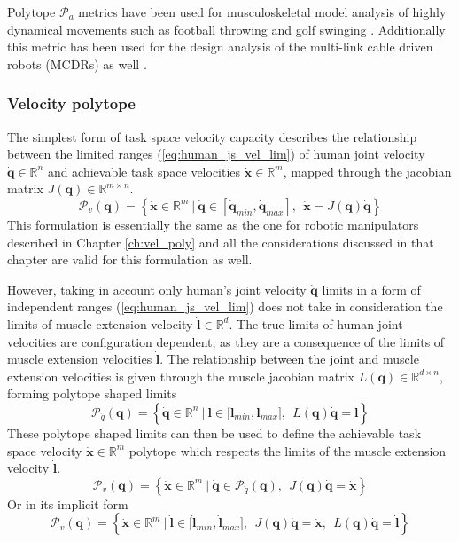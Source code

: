 Polytope $\mathcal{P}_a$ metrics have been used for musculoskeletal model analysis of highly dynamical movements such as football throwing \cite{khatib2009robotics} and golf swinging \cite{demircan2012muscle}. Additionally this metric has been used for the design analysis of the multi-link cable driven robots (MCDRs) as well \cite{sheng2020operational}.

\subsubsection{Velocity polytope}

The simplest form of task space velocity capacity describes the relationship between the limited ranges (\ref{eq:human_js_vel_lim}) of human joint velocity $\dot{\bm{q}} \in \mathbb{R}^n$ and achievable task space velocities $\dot{\bm{x}} \in \mathbb{R}^m$, mapped through the jacobian matrix $J(\bm{q}) \in \mathbb{R}^{m\times n}$.
\begin{equation}
    \mathcal{P}_v(\bm{q}) = \left\{ \dot{\bm{x}} \in \mathbb{R}^m ~|~ \dot{\bm{q}}\in\left[\dot{\bm{q}}_{min}, \dot{\bm{q}}_{max} \right], ~~ \dot{\bm{x}} = J(\bm{q})\dot{\bm{q}} \right\}
\end{equation}
This formulation is essentially the same as the one for robotic manipulators described in Chapter \ref{ch:vel_poly} and all the considerations discussed in that chapter are valid for this formulation as well.

However, taking in account only human's joint velocity $\dot{\bm{q}}$ limits in a form of independent ranges (\ref{eq:human_js_vel_lim}) does not take in consideration the limits of muscle extension velocity $\dot{\bm{l}}\in\mathbb{R}^d$. The true limits of human joint velocities are configuration dependent, as they are a consequence of the limits of muscle extension velocities $\dot{\bm{l}}$. The relationship between the joint and muscle extension velocities is given through the muscle jacobian matrix $L(\bm{q}) \in \mathbb{R}^{d\times n}$, forming polytope shaped limits
\begin{equation}
    \mathcal{P}_{\dot{q}}(\bm{q}) = \left\{ \dot{\bm{q}} \in \mathbb{R}^n ~|~ \dot{\bm{l}}\in\big[\dot{\bm{l}}_{min}, \dot{\bm{l}}_{max} \big], ~~ L(\bm{q})\dot{\bm{q}} = \dot{\bm{l}} \right\}
    \label{eq:human_poly_joint_vel}
\end{equation}
These polytope shaped limits can then be used to define the achievable task space velocity $\dot{\bm{x}}\in \mathbb{R}^m$ polytope which respects the limits of the muscle extension velocity $\dot{\bm{l}}$.
\begin{equation}
    \mathcal{P}_v(\bm{q}) = \left\{ \dot{\bm{x}} \in \mathbb{R}^m ~|~ \dot{\bm{q}}\in  \mathcal{P}_{\dot{q}}(\bm{q}), ~~ J(\bm{q})\dot{\bm{q}} = \dot{\bm{x}} \right\}
\end{equation}
Or in its implicit form
\begin{equation}
    \mathcal{P}_v(\bm{q}) = \left\{ \dot{\bm{x}} \in \mathbb{R}^m ~|~ \dot{\bm{l}}\in\big[\dot{\bm{l}}_{min}, \dot{\bm{l}}_{max} \big], ~~ J(\bm{q})\dot{\bm{q}} = \dot{\bm{x}}, ~~ L(\bm{q})\dot{\bm{q}} = \dot{\bm{l}} \right\}
    \label{eq:velocity_polytope_human}
\end{equation}

